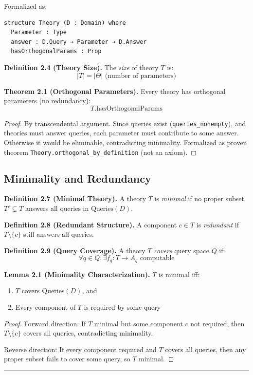 Formalized as:
\begin{lstlisting}[language=lean]
structure Theory (D : Domain) where
  Parameter : Type
  answer : D.Query → Parameter → D.Answer
  hasOrthogonalParams : Prop
\end{lstlisting}

\textbf{Definition 2.4 (Theory Size).} The \emph{size} of theory $T$ is:
$$|T| = |\Theta| \text{ (number of parameters)}$$

\textbf{Theorem 2.1 (Orthogonal Parameters).} Every theory has orthogonal parameters (no redundancy):
$$T.\text{hasOrthogonalParams}$$

\begin{proof}
By transcendental argument. Since queries exist (\texttt{queries\_nonempty}), and theories must answer queries, each parameter must contribute to some answer. Otherwise it would be eliminable, contradicting minimality. Formalized as proven theorem \texttt{Theory.orthogonal\_by\_definition} (not an axiom).
\end{proof}

\subsection{Minimality and Redundancy}\label{minimality-and-redundancy}

\textbf{Definition 2.7 (Minimal Theory).} A theory $T$ is \emph{minimal} if no 
proper subset $T' \subsetneq T$ answers all queries in $\text{Queries}(D)$.

\textbf{Definition 2.8 (Redundant Structure).} A component $c \in T$ is 
\emph{redundant} if $T \setminus \{c\}$ still answers all queries.

\textbf{Definition 2.9 (Query Coverage).} A theory $T$ \emph{covers} query space 
$Q$ if:
$$\forall q \in Q, \exists f_q : T \to A_q \text{ computable}$$

\textbf{Lemma 2.1 (Minimality Characterization).} $T$ is minimal iff:
\begin{enumerate}
\item $T$ covers $\text{Queries}(D)$, and
\item Every component of $T$ is required by some query
\end{enumerate}

\begin{proof}
Forward direction: If $T$ minimal but some component $c$ not required, then 
$T \setminus \{c\}$ covers all queries, contradicting minimality.

Reverse direction: If every component required and $T$ covers all queries, then 
any proper subset fails to cover some query, so $T$ minimal.
\end{proof}

\begin{center}\rule{0.5\linewidth}{0.5pt}\end{center}

